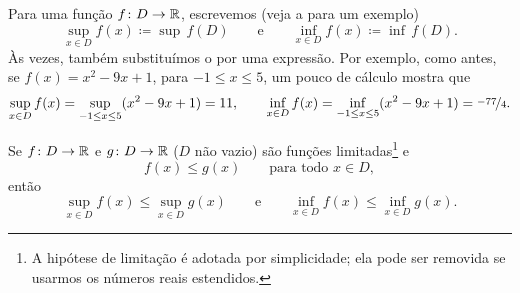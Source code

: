 \begin{myfigureht}
\caption{Exemplo de uma função limitada, uma cota $M$ e seu supremo e ínfimo.\label{boundedfuncfig}}
\end{myfigureht}
Para uma função $f \colon D \to {\mathbb{R}}$, escrevemos
(veja a  para
um exemplo)
\begin{equation*}
\sup_{x \in D} f(x) \coloneqq \sup\, f(D) \qquad \text{e} \qquad
\inf_{x \in D} f(x) \coloneqq \inf\, f(D) .
\end{equation*}
Às vezes, também substituímos o  por uma expressão.
Por exemplo, como antes, se $f(x) = x^2-9x+1$, para $-1 \leq x \leq 5$,
um pouco de cálculo mostra que
\begin{equation*}
\sup_{x \in D} f(x) =
\sup_{-1 \leq x \leq 5} ( x^2 -9x+1 ) = 11,
\qquad
\inf_{x \in D} f(x) =
\inf_{-1 \leq x \leq 5} ( x^2 -9x+1 ) = \nicefrac{-77}{4} .
\end{equation*}



\begin{prop} \label{prop:funcsupinf}
Se $f \colon D \to {\mathbb{R}}$ e $g \colon D \to {\mathbb{R}}$ ($D$ não vazio) são
funções limitadas\footnote{A hipótese de limitação é adotada por simplicidade;
ela pode ser removida se usarmos os números reais estendidos.}
e
\begin{equation*}
f(x) \leq g(x) \qquad \text{para todo } x \in D,
\end{equation*}
então
\begin{equation} \label{prop:funcsupinf:eq}
\sup_{x \in D} f(x) \leq \sup_{x \in D} g(x)
\qquad \text{e} \qquad
\inf_{x \in D} f(x) \leq \inf_{x \in D} g(x) .
\end{equation}
\end{prop}

